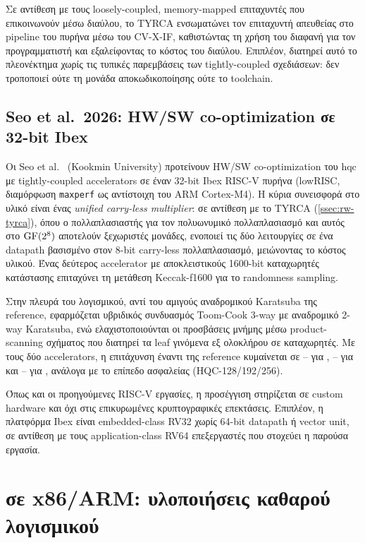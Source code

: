 Σε αντίθεση με τους loosely-coupled, memory-mapped επιταχυντές που 
επικοινωνούν μέσω διαύλου, το TYRCA ενσωματώνει τον επιταχυντή απευθείας 
στο pipeline του πυρήνα μέσω του CV-X-IF, καθιστώντας τη χρήση του 
διαφανή για τον προγραμματιστή και εξαλείφοντας το κόστος του διαύλου. 
Επιπλέον, διατηρεί αυτό το πλεονέκτημα χωρίς τις τυπικές παρεμβάσεις 
των tightly-coupled σχεδιάσεων: δεν τροποποιεί ούτε τη μονάδα αποκωδικοποίησης ούτε το toolchain.

\subsection{Seo et al.\ 2026: HW/SW co-optimization σε 32-bit Ibex}
\label{ssec:rw-seo-ibex}

Οι Seo et al.~\cite{Seo2026-HQC-Ibex} (Kookmin University) προτείνουν HW/SW
co-optimization του \gls{hqc} με tightly-coupled accelerators σε έναν 32-bit Ibex
RISC-V πυρήνα (lowRISC, διαμόρφωση \texttt{maxperf} ως αντίστοιχη του ARM
Cortex-M4). Η κύρια συνεισφορά στο υλικό είναι ένας \emph{unified carry-less
multiplier}: σε αντίθεση με το TYRCA (\cref{ssec:rw-tyrca}), όπου ο πολλαπλασιαστής
για τον πολυωνυμικό πολλαπλασιασμό και αυτός στο $\mathrm{GF}(2^8)$ αποτελούν ξεχωριστές
μονάδες, ενοποιεί τις δύο λειτουργίες σε ένα datapath βασισμένο στον 8-bit
carry-less πολλαπλασιασμό, μειώνοντας το κόστος υλικού. Ένας δεύτερος accelerator
με αποκλειστικούς 1600-bit καταχωρητές κατάστασης επιταχύνει τη μετάθεση
Keccak-f1600 για το randomness sampling.

Στην πλευρά του λογισμικού, αντί του αμιγούς αναδρομικού Karatsuba της reference,
εφαρμόζεται υβριδικός συνδυασμός Toom-Cook 3-way με αναδρομικό 2-way Karatsuba,
ενώ ελαχιστοποιούνται οι προσβάσεις μνήμης μέσω product-scanning σχήματος που
διατηρεί τα leaf γινόμενα εξ ολοκλήρου σε καταχωρητές. Με τους δύο accelerators, η
επιτάχυνση έναντι της reference κυμαίνεται σε -- για
\KeyGen, -- για \Encaps και
-- για \Decaps, ανάλογα με το επίπεδο ασφαλείας 
(HQC-128/192/256).

Όπως και οι προηγούμενες RISC-V εργασίες, η προσέγγιση στηρίζεται σε custom
hardware και όχι στις επικυρωμένες κρυπτογραφικές επεκτάσεις. Επιπλέον, η
πλατφόρμα Ibex είναι embedded-class RV32 χωρίς 64-bit datapath ή vector unit, σε
αντίθεση με τους application-class RV64 επεξεργαστές που στοχεύει η παρούσα
εργασία.

\section{\HQC σε x86/ARM: υλοποιήσεις καθαρού λογισμικού}
\label{sec:rw-analogs}

